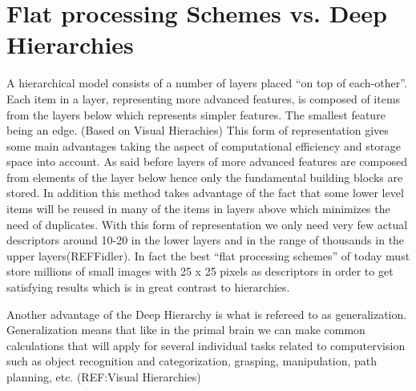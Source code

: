 \section*{Flat processing Schemes vs. Deep Hierarchies}
A hierarchical model consists of a number of layers placed “on top of each-other”. Each item in a layer, representing more advanced features, is composed of items from the layers below which represents simpler features. The smallest feature being an edge. 
(Based on Visual Hierachies)
This form of representation gives some main advantages taking the aspect of computational efficiency and storage space into account. As said before layers of more advanced features are composed from elements of the layer below hence only the fundamental building blocks are stored. In addition this method takes advantage of the fact that some lower level items will be reused in many of the items in layers above which minimizes the need of duplicates. With this form of representation we only need very few actual descriptors around 10-20 in the lower layers and in the range of thousands in the upper layers(REFFidler). 
In fact the best “flat processing schemes” of today must store millions of small images with 25 x 25 pixels as descriptors in order to get satisfying results which is in great contrast to hierarchies.

Another advantage of the Deep Hierarchy is what is refereed to as generalization. Generalization means that like in the primal brain we can make common calculations that will apply for several individual tasks related to computervision such as object recognition and categorization, grasping, manipulation, path
 planning, etc. (REF:Visual Hierarchies)